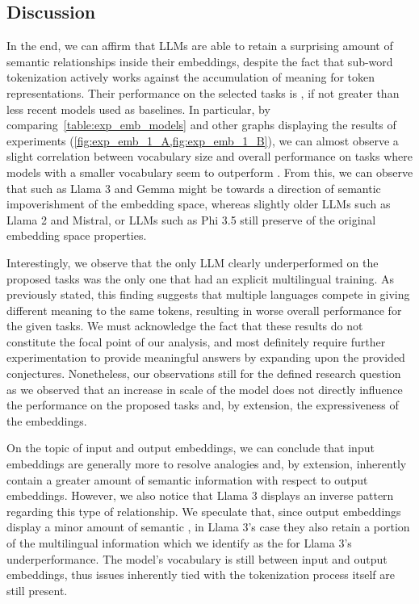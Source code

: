 \subsection{Discussion}\label{ssec:exp_emb_discussion}

In the end, we can affirm that LLMs are able to retain a surprising amount of semantic relationships inside their embeddings, despite the fact that sub-word tokenization actively works against the accumulation of meaning for token representations.
Their performance on the selected tasks is , if not greater than less recent models used as baselines.
In particular, by comparing~\cref{table:exp_emb_models} and other graphs displaying the results of experiments (\cref{fig:exp_emb_1_A,fig:exp_emb_1_B}), we can almost observe a slight correlation between vocabulary size and overall performance on tasks where models with a smaller vocabulary seem to outperform .
From this, we can observe that  such as Llama 3 and Gemma might be  towards a direction of semantic impoverishment of the embedding space, whereas slightly older LLMs such as Llama 2 and Mistral, or LLMs  such as Phi 3.5 still preserve  of the original embedding space properties.

Interestingly, we observe that the only LLM  clearly underperformed on the proposed tasks was the only one that had an explicit multilingual training.
As previously stated, this finding suggests that multiple languages compete in giving different meaning to the same tokens, resulting in worse overall performance for the given tasks.
We must acknowledge the fact that these results do not constitute the focal point of our analysis, and most definitely require further experimentation to provide meaningful answers by expanding upon the provided conjectures.
Nonetheless, our observations still  for the defined research question as we observed that an increase in scale of the model does not directly influence the performance on the proposed tasks and, by extension, the expressiveness of the embeddings.

On the topic of input and output embeddings, we can conclude that input embeddings are generally more  to resolve analogies and, by extension, inherently contain a greater amount of semantic information with respect to output embeddings.
However, we also notice that Llama 3 displays an inverse pattern regarding this type of relationship.
We speculate that, since output embeddings display a minor amount of semantic , in Llama 3's case they also retain a  portion of the multilingual information which we identify as the  for Llama 3's underperformance.
The model's vocabulary is still  between input and output embeddings, thus issues inherently tied with the tokenization process itself are still present.

